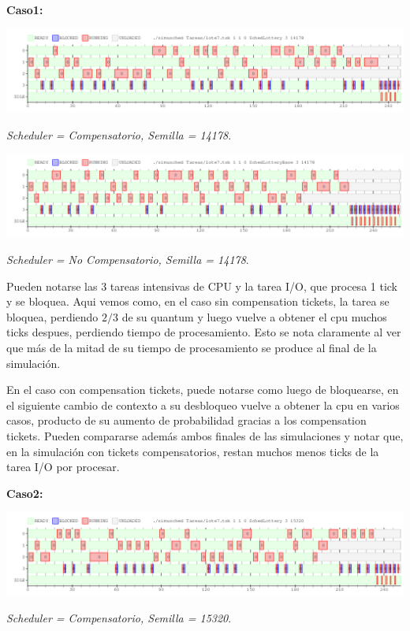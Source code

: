 \textbf{Caso1:}

\includegraphics[width=1\textwidth]{./Graficos/Ej10v2/Task7/ej9_1.png}
\begin{center}
 \textit{Scheduler = Compensatorio, Semilla = 14178}.
\end{center}


\includegraphics[width=1\textwidth]{./Graficos/Ej10v2/Task7/ej9_1_base.png}
\begin{center}
 \textit{Scheduler = No Compensatorio, Semilla = 14178}.
\end{center}

\vspace{2mm}


Pueden notarse las 3 tareas intensivas de CPU y la tarea I/O, que procesa 1 tick y se bloquea. Aqui vemos como, en el caso sin compensation tickets, la tarea se bloquea, perdiendo $2/3$ de su quantum y luego vuelve a obtener el cpu muchos ticks despues, perdiendo tiempo de procesamiento. Esto se nota claramente al ver que m\'as de la mitad de su tiempo de procesamiento se produce al final de la simulaci\'on.

\vspace{2mm}

En el caso con compensation tickets, puede notarse como luego de bloquearse, en el siguiente cambio de contexto a su desbloqueo vuelve a obtener la cpu en varios casos, producto de su aumento de probabilidad gracias a los compensation tickets. Pueden compararse adem\'as ambos finales de las simulaciones y notar que, en la simulaci\'on con tickets compensatorios, restan muchos menos ticks de la tarea I/O por procesar.

\vspace{2mm}
\textbf{Caso2:}

\includegraphics[width=1\textwidth]{./Graficos/Ej10v2/Task7/ej9_2.png}
\begin{center}
 \textit{Scheduler = Compensatorio, Semilla = 15320}.
\end{center}


